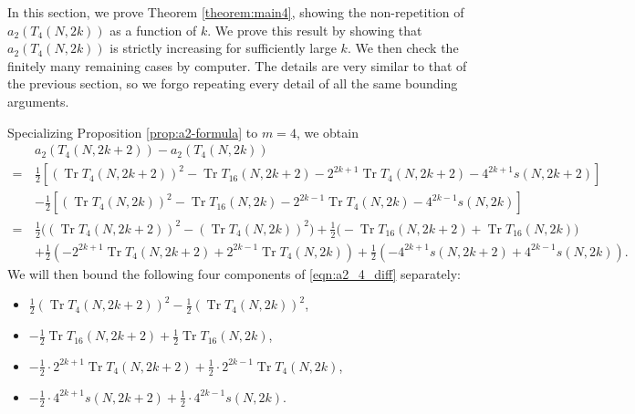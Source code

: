 \documentclass[11pt,letterpaper,reqno]{amsart}
\numberwithin{figure}{section}
\numberwithin{table}{section}
\theoremstyle{definition}
\theoremstyle{plain}
\newcommand{\lrp}[1]{\left(#1\right)}
\newcommand{\lrb}[1]{\left[#1\right]}
\theoremstyle{definition}
\theoremstyle{definition}
\theoremstyle{remark}
\numberwithin{equation}{section}
\DeclareMathOperator{\Tr}{Tr}
\begin{document}
In this section, we prove Theorem \ref{theorem:main4}, showing the non-repetition of $a_2(T_4(N, 2k))$ as a function of $k$. We prove this result by showing that $a_2(T_4(N, 2k))$ is strictly increasing for sufficiently large $k$. We then check the finitely many remaining cases by computer.  
The details are very similar to that of the previous section, so we forgo repeating every detail of all the same bounding arguments. 

Specializing Proposition \ref{prop:a2-formula} to $m=4$, we obtain
\begin{align}
    &a_2(T_4(N, 2k + 2)) - a_2(T_4(N, 2k))\\ 
    =\, &\frac{1}{2} 
    \lrb{(\Tr T_4(N, 2k+2))^2-\Tr T_{16}(N, 2k+2) -  2^{2k+1} \Tr T_4(N, 2k+2) -  4^{2k+1} s(N, 2k+2) } \\
    & -\frac{1}{2} 
    \lrb{(\Tr T_4(N, 2k))^2-\Tr T_{16}(N, 2k) -  2^{2k-1} \Tr T_4(N, 2k) -  4^{2k-1} s(N, 2k) } \\
    =\, & \frac12 \Big( (\Tr T_4(N, 2k+2))^2 - (\Tr T_4(N, 2k))^2 \Big) + \frac12 \Big( - \Tr T_{16}(N, 2k+2) + \Tr T_{16}(N, 2k) \Big)  \\
    & + \frac12 \lrp{- 2^{2k+1} \Tr T_4(N, 2k+2) + 2^{2k-1} \Tr T_4(N, 2k) } 
    + \frac12 \lrp{- 4^{2k+1} s(N, 2k+2) + 4^{2k-1} s(N, 2k) }.  \label{eqn:a2_4_diff}
\end{align}
We will then bound the following four components of \eqref{eqn:a2_4_diff} separately:
\begin{itemize}
    \item $\frac{1}{2}(\Tr T_4(N, 2k+2))^2 - \frac{1}{2}(\Tr T_4(N, 2k))^2$,
    \item $-\frac{1}{2}\Tr T_{16}(N, 2k+2) + \frac{1}{2}\Tr T_{16}(N, 2k)$,
    \item $- \frac12 \cdot 2^{2k+1} \Tr T_4(N, 2k+2) + \frac12 \cdot 2^{2k-1} \Tr T_4(N, 2k)$,
    \item $-\frac12 \cdot 4^{2k+1}s(N, 2k+2) + \frac12 \cdot 4^{2k-1}s(N, 2k)$.
\end{itemize}
\end{document}

